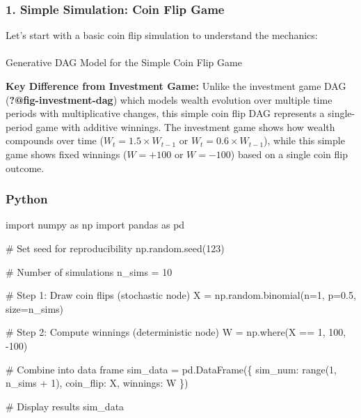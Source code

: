 \documentclass[
  letterpaper,
  DIV=11,
  numbers=noendperiod]{scrartcl}
\makeatletter
\let\oldparagraph\paragraph
\renewcommand{\paragraph}{
    \@ifstar
      \xxxParagraphStar
      \xxxParagraphNoStar
  }
\newcommand{\xxxParagraphStar}[1]{\oldparagraph*{#1}\mbox{}}
\newcommand{\xxxParagraphNoStar}[1]{\oldparagraph{#1}\mbox{}}
\newenvironment{Shaded}{\begin{snugshade}}{\end{snugshade}}
\newcommand{\BuiltInTok}[1]{\textcolor[rgb]{0.00,0.23,0.31}{#1}}
\newcommand{\CommentTok}[1]{\textcolor[rgb]{0.37,0.37,0.37}{#1}}
\newcommand{\DecValTok}[1]{\textcolor[rgb]{0.68,0.00,0.00}{#1}}
\newcommand{\FloatTok}[1]{\textcolor[rgb]{0.68,0.00,0.00}{#1}}
\newcommand{\ImportTok}[1]{\textcolor[rgb]{0.00,0.46,0.62}{#1}}
\newcommand{\NormalTok}[1]{\textcolor[rgb]{0.00,0.23,0.31}{#1}}
\newcommand{\OperatorTok}[1]{\textcolor[rgb]{0.37,0.37,0.37}{#1}}
\newcommand{\StringTok}[1]{\textcolor[rgb]{0.13,0.47,0.30}{#1}}
\theoremstyle{definition}
\theoremstyle{remark}
\makeatother
\begin{document}
\subsubsection{1. Simple Simulation: Coin Flip
Game}\label{simple-simulation-coin-flip-game}

Let's start with a basic coin flip simulation to understand the
mechanics:

\paragraph{Generative DAG Model for the Simple Coin Flip
Game}\label{generative-dag-model-for-the-simple-coin-flip-game}

\textbf{Key Difference from Investment Game:} Unlike the investment game
DAG (\textbf{?@fig-investment-dag}) which models wealth evolution over
multiple time periods with multiplicative changes, this simple coin flip
DAG represents a single-period game with additive winnings. The
investment game shows how wealth compounds over time
(\(W_t = 1.5 \times W_{t-1}\) or \(W_t = 0.6 \times W_{t-1}\)), while
this simple game shows fixed winnings (\(W = +100\) or \(W = -100\))
based on a single coin flip outcome.

\subsubsection{Python}

\begin{Shaded}
\begin{Highlighting}[]
\ImportTok{import}\NormalTok{ numpy }\ImportTok{as}\NormalTok{ np}
\ImportTok{import}\NormalTok{ pandas }\ImportTok{as}\NormalTok{ pd}

\CommentTok{\# Set seed for reproducibility}
\NormalTok{np.random.seed(}\DecValTok{123}\NormalTok{)}

\CommentTok{\# Number of simulations}
\NormalTok{n\_sims }\OperatorTok{=} \DecValTok{10}

\CommentTok{\# Step 1: Draw coin flips (stochastic node)}
\NormalTok{X }\OperatorTok{=}\NormalTok{ np.random.binomial(n}\OperatorTok{=}\DecValTok{1}\NormalTok{, p}\OperatorTok{=}\FloatTok{0.5}\NormalTok{, size}\OperatorTok{=}\NormalTok{n\_sims)}

\CommentTok{\# Step 2: Compute winnings (deterministic node)}
\NormalTok{W }\OperatorTok{=}\NormalTok{ np.where(X }\OperatorTok{==} \DecValTok{1}\NormalTok{, }\DecValTok{100}\NormalTok{, }\OperatorTok{{-}}\DecValTok{100}\NormalTok{)}

\CommentTok{\# Combine into data frame}
\NormalTok{sim\_data }\OperatorTok{=}\NormalTok{ pd.DataFrame(\{}
    \StringTok{\textquotesingle{}sim\_num\textquotesingle{}}\NormalTok{: }\BuiltInTok{range}\NormalTok{(}\DecValTok{1}\NormalTok{, n\_sims }\OperatorTok{+} \DecValTok{1}\NormalTok{),}
    \StringTok{\textquotesingle{}coin\_flip\textquotesingle{}}\NormalTok{: X,}
    \StringTok{\textquotesingle{}winnings\textquotesingle{}}\NormalTok{: W}
\NormalTok{\})}

\CommentTok{\# Display results}
\NormalTok{sim\_data}
\end{Highlighting}
\end{Shaded}
\end{document}
